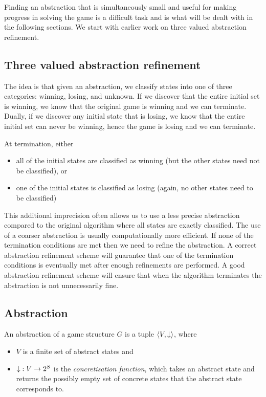 Finding an abstraction that is simultaneously small and useful for making progress in solving the game is a difficult task and is what will be dealt with in the following sections. We start with earlier work on three valued abstraction refinement. 

\subsection{Three valued abstraction refinement}

The idea is that given an abstraction, we classify states into one of three categories: winning, losing, and unknown. If we discover that the entire initial set is winning, we know that the original game is winning and we can terminate. Dually, if we discover any initial state that is losing, we know that the entire initial set can never be winning, hence the game is losing and we can terminate. 

At termination, either 
\begin{itemize}
\item all of the initial states are classified as winning (but the other states need not be classified), or
\item one of the initial states is classified as losing (again, no other states need to be classified)
\end{itemize}

This additional imprecision often allows us to use a less precise abstraction compared to the original algorithm where all states are exactly classified. The use of a coarser abstraction is usually computationally more efficient. If none of the termination conditions are met then we need to refine the abstraction. A correct abstraction refinement scheme will guarantee that one of the termination conditions is eventually met after enough refinements are performed. A good abstraction refinement scheme will ensure that when the algorithm terminates the abstraction is not unnecessarily fine.

\subsection{Abstraction}
\label{sec:abstraction_def}

An abstraction of a game structure $G$ is a tuple $\langle V, \mathord{\downarrow}\rangle$, where 
\begin{itemize}
    \item $V$ is a finite set of abstract states and 
    \item $\mathord{\downarrow} : V \rightarrow 2^S $ is the \emph{concretisation function}, which takes an abstract state and returns the possibly empty set of concrete states that the abstract state corresponds to.  
\end{itemize}
        
